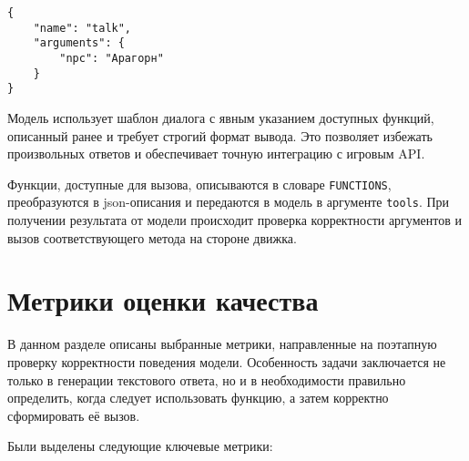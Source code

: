 \documentclass[14pt]{extarticle}
\begin{document}
\begin{verbatim}
{
    "name": "talk",
    "arguments": {
        "npc": "Арагорн"
    }
}
\end{verbatim}

Модель использует шаблон диалога с явным указанием доступных функций, описанный ранее и требует строгий формат вывода. Это позволяет избежать произвольных ответов и обеспечивает точную интеграцию с игровым API.

Функции, доступные для вызова, описываются в словаре \texttt{FUNCTIONS}, преобразуются в json-описания и передаются в модель в аргументе \texttt{tools}. При получении результата от модели происходит проверка корректности аргументов и вызов соответствующего метода на стороне движка.


\section{Метрики оценки качества}
В данном разделе описаны выбранные метрики, направленные на поэтапную проверку корректности поведения модели. Особенность задачи заключается не только в генерации текстового ответа, но и в необходимости правильно определить, когда следует использовать функцию, а затем корректно сформировать её вызов.

Были выделены следующие ключевые метрики:
\end{document}
